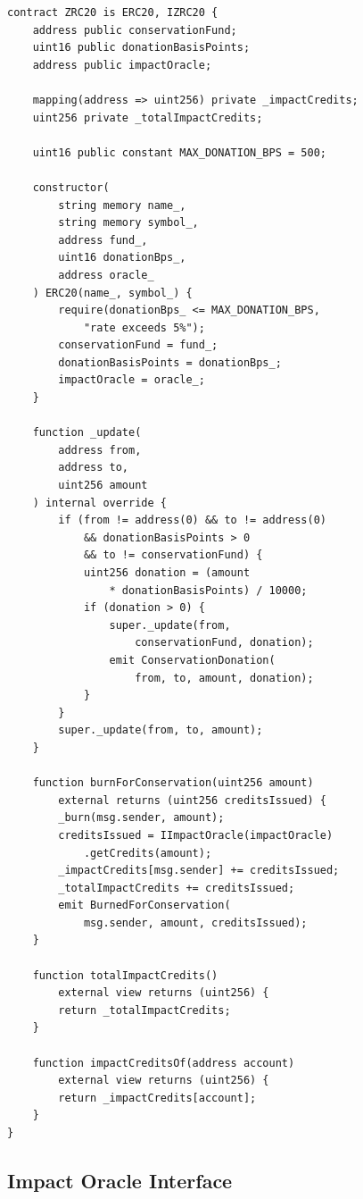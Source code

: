 \documentclass[11pt,letterpaper]{article}
\begin{document}
\begin{lstlisting}[language=Solidity,caption=ZRC20 reference implementation (core transfer logic)]
contract ZRC20 is ERC20, IZRC20 {
    address public conservationFund;
    uint16 public donationBasisPoints;
    address public impactOracle;

    mapping(address => uint256) private _impactCredits;
    uint256 private _totalImpactCredits;

    uint16 public constant MAX_DONATION_BPS = 500;

    constructor(
        string memory name_,
        string memory symbol_,
        address fund_,
        uint16 donationBps_,
        address oracle_
    ) ERC20(name_, symbol_) {
        require(donationBps_ <= MAX_DONATION_BPS,
            "rate exceeds 5%");
        conservationFund = fund_;
        donationBasisPoints = donationBps_;
        impactOracle = oracle_;
    }

    function _update(
        address from,
        address to,
        uint256 amount
    ) internal override {
        if (from != address(0) && to != address(0)
            && donationBasisPoints > 0
            && to != conservationFund) {
            uint256 donation = (amount
                * donationBasisPoints) / 10000;
            if (donation > 0) {
                super._update(from,
                    conservationFund, donation);
                emit ConservationDonation(
                    from, to, amount, donation);
            }
        }
        super._update(from, to, amount);
    }

    function burnForConservation(uint256 amount)
        external returns (uint256 creditsIssued) {
        _burn(msg.sender, amount);
        creditsIssued = IImpactOracle(impactOracle)
            .getCredits(amount);
        _impactCredits[msg.sender] += creditsIssued;
        _totalImpactCredits += creditsIssued;
        emit BurnedForConservation(
            msg.sender, amount, creditsIssued);
    }

    function totalImpactCredits()
        external view returns (uint256) {
        return _totalImpactCredits;
    }

    function impactCreditsOf(address account)
        external view returns (uint256) {
        return _impactCredits[account];
    }
}
\end{lstlisting}

\subsection{Impact Oracle Interface}
\end{document}
